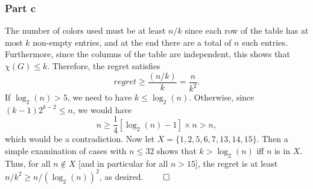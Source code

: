 \documentclass[10pt,a4paper]{article}
\newcommand{\1}{\mathbf{1}}
\begin{document}
\subsubsection*{Part c}
The number of colors used must be at least $n/k$ since each row of the table has at most $k$ non-empty entries, and at the end there are a total of $n$ such entries.  Furthermore, since the columns of the table are independent, this shows that $\chi(G) \leq k$.  Therefore, the regret satisfies
\[
regret \geq \dfrac{(n/k)}{k} = \dfrac{n}{k^2}.
\]
If $\log_2 (n) > 5$, we need to have $k \leq \log_2(n)$.  Otherwise, since $(k-1) 2^{k-2} \leq n$, we would have
\[
n \geq \dfrac{1}{4}[\log_2(n) -1] \times n > n,
\]
which would be a contradiction.  Now let $X= \{1, 2, 5, 6, 7, 13, 14, 15\}$.  Then a simple examination of cases with $n \leq 32$ shows that $k > \log_{2} (n)$ iff $n$ is in $X$.  Thus, for all $n \notin X$ [and in particular for all $n > 15$], the regret is at least $n/k^2 \geq n/(\log_2 (n))^2$, as desired. $\qed$

\label{pr:6:end}
\end{document}
